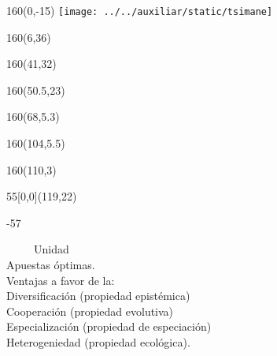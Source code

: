 \documentclass[shownotes,aspectratio=169]{beamer}
\newcounter{capitulo}
\newcommand{\unidad}{\thecapitulo \stepcounter{capitulo}}
\begin{document}
\begin{frame}

\begin{textblock}{160}(0,-15)
\texttt{[image: ../../auxiliar/static/tsimane]}
\end{textblock}


\begin{textblock}{160}(6,36)
\LARGE {}
\end{textblock}
\begin{textblock}{160}(41,32)
\LARGE {}
\end{textblock}
\begin{textblock}{160}(50.5,23)
\LARGE {}
\end{textblock}
\begin{textblock}{160}(68,5.3)
\LARGE {}
\end{textblock}
\begin{textblock}{160}(104,5.5)
\LARGE {}
\end{textblock}
\begin{textblock}{160}(110,3)
\LARGE {}
\end{textblock}


\begin{textblock}{55}[0,0](119,22)
\begin{turn}{-57}
\parbox{7cm}{\sloppy\setlength\parfillskip{0pt}
\textcolor{black!0}{\ \ \ \ \ Unidad \unidad} \\
\small\textcolor{black!5}{\hspace{-0.15cm} Apuestas óptimas.} \\
\small\textcolor{black!5}{\hspace{-0.85cm} Ventajas a favor de la:} \\
\small\textcolor{black!5}{\hspace{-1.45cm} Diversificación (propiedad epistémica)}\\
\small\textcolor{black!5}{\hspace{-1.7cm} Cooperación (propiedad evolutiva)}\\
\small\textcolor{black!5}{ \hspace{-1.75cm}Especialización (propiedad de especiación)} \\
\small\textcolor{black!5}{\hspace{-2cm} Heterogeniedad (propiedad ecológica).\\ }}
\end{turn}
\end{textblock}



\end{frame}
\end{document}
